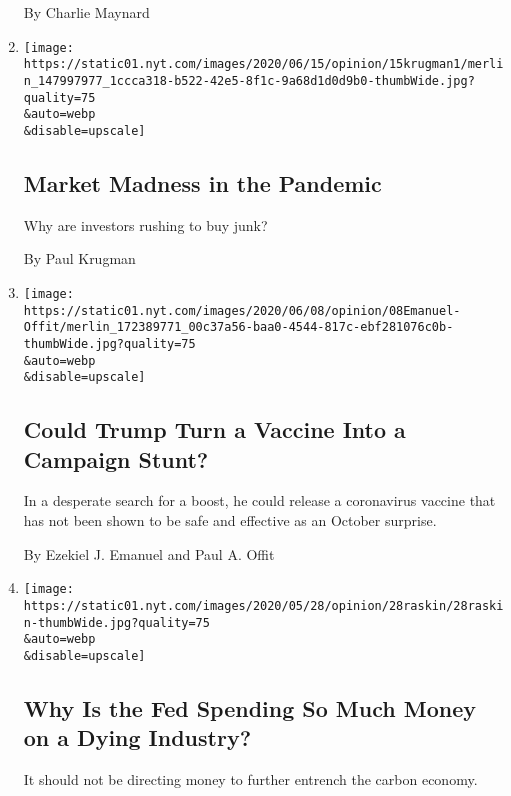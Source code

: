 \begin{enumerate}
  By Charlie Maynard
\item
  \href{/2020/06/15/opinion/coronavirus-stock-market.html}{}

  \texttt{[image: https://static01.nyt.com/images/2020/06/15/opinion/15krugman1/merlin\_147997977\_1ccca318-b522-42e5-8f1c-9a68d1d0d9b0-thumbWide.jpg?quality=75\\\&auto=webp\\\&disable=upscale]}

  \hypertarget{market-madness-in-the-pandemic}{%
  \subsection{Market Madness in the
  Pandemic}\label{market-madness-in-the-pandemic}}

  Why are investors rushing to buy junk?

  By Paul Krugman
\item
  \href{/2020/06/08/opinion/trump-coronavirus-vaccine.html}{}

  \texttt{[image: https://static01.nyt.com/images/2020/06/08/opinion/08Emanuel-Offit/merlin\_172389771\_00c37a56-baa0-4544-817c-ebf281076c0b-thumbWide.jpg?quality=75\\\&auto=webp\\\&disable=upscale]}

  \hypertarget{could-trump-turn-a-vaccine-into-a-campaign-stunt}{%
  \subsection{Could Trump Turn a Vaccine Into a Campaign
  Stunt?}\label{could-trump-turn-a-vaccine-into-a-campaign-stunt}}

  In a desperate search for a boost, he could release a coronavirus
  vaccine that has not been shown to be safe and effective as an October
  surprise.

  By Ezekiel J. Emanuel and Paul A. Offit
\item
  \href{/2020/05/28/opinion/fed-fossil-fuels.html}{}

  \texttt{[image: https://static01.nyt.com/images/2020/05/28/opinion/28raskin/28raskin-thumbWide.jpg?quality=75\\\&auto=webp\\\&disable=upscale]}

  \hypertarget{why-is-the-fed-spending-so-much-money-on-a-dying-industry}{%
  \subsection{Why Is the Fed Spending So Much Money on a Dying
  Industry?}\label{why-is-the-fed-spending-so-much-money-on-a-dying-industry}}

  It should not be directing money to further entrench the carbon
  economy.


\end{enumerate}
